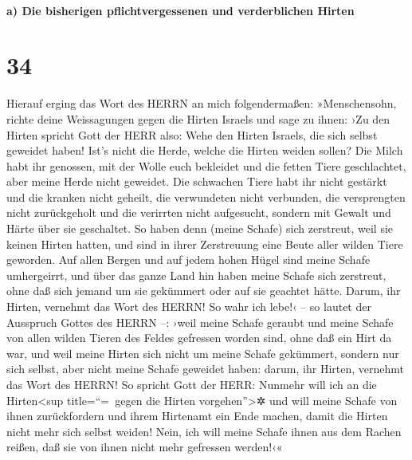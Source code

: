 \hypertarget{a-die-bisherigen-pflichtvergessenen-und-verderblichen-hirten}{%
\paragraph{a) Die bisherigen pflichtvergessenen und verderblichen
Hirten}\label{a-die-bisherigen-pflichtvergessenen-und-verderblichen-hirten}}

\hypertarget{section-33}{%
\section{34}\label{section-33}}

Hierauf erging das Wort des HERRN an mich folgendermaßen:
»Menschensohn, richte deine Weissagungen gegen die Hirten
Israels und sage zu ihnen: ›Zu den Hirten spricht Gott der HERR also:
Wehe den Hirten Israels, die sich selbst geweidet haben! Ist's nicht die
Herde, welche die Hirten weiden sollen? Die Milch habt ihr
genossen, mit der Wolle euch bekleidet und die fetten Tiere
geschlachtet, aber meine Herde nicht geweidet. Die
schwachen Tiere habt ihr nicht gestärkt und die kranken nicht geheilt,
die verwundeten nicht verbunden, die versprengten nicht zurückgeholt und
die verirrten nicht aufgesucht, sondern mit Gewalt und Härte über sie
geschaltet. So haben denn (meine Schafe) sich zerstreut,
weil sie keinen Hirten hatten, und sind in ihrer Zerstreuung eine Beute
aller wilden Tiere geworden. Auf allen Bergen und auf
jedem hohen Hügel sind meine Schafe umhergeirrt, und über das ganze Land
hin haben meine Schafe sich zerstreut, ohne daß sich jemand um sie
gekümmert oder auf sie geachtet hätte. Darum, ihr Hirten,
vernehmt das Wort des HERRN! So wahr ich lebe!‹ -- so
lautet der Ausspruch Gottes des HERRN --: ›weil meine Schafe geraubt und
meine Schafe von allen wilden Tieren des Feldes gefressen worden sind,
ohne daß ein Hirt da war, und weil meine Hirten sich nicht um meine
Schafe gekümmert, sondern nur sich selbst, aber nicht meine Schafe
geweidet haben: darum, ihr Hirten, vernehmt das Wort des
HERRN! So spricht Gott der HERR: Nunmehr will ich an die
Hirten\textless sup title=``=~gegen die Hirten vorgehen''\textgreater✲
und will meine Schafe von ihnen zurückfordern und ihrem Hirtenamt ein
Ende machen, damit die Hirten nicht mehr sich selbst weiden! Nein, ich
will meine Schafe ihnen aus dem Rachen reißen, daß sie von ihnen nicht
mehr gefressen werden!‹«

